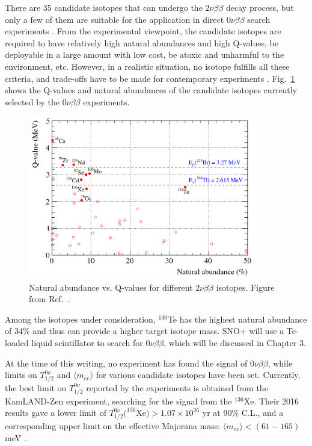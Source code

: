 There are 35 candidate isotopes that can undergo the $2\nu\beta\beta$ decay process, but only a few of them are suitable for the application in direct $0\nu\beta\beta$ search experiments \cite{giunti2007fundamentals}. From the experimental viewpoint, the candidate isotopes are required to have relatively high natural abundances and high Q-values, be deployable in a large amount with low cost, be atoxic and unharmful to the environment, etc. However, in a realistic situation, no isotope fulfills all these criteria, and trade-offs have to be made for contemporary experiments \cite{dolinski2019neutrinoless}. Fig.~\ref{fig:te_abundance} shows the Q-values and natural abundances of the candidate isotopes currently selected by the $0\nu\beta\beta$ experiments.

\begin{figure}[!htb]
	\centering
	\includegraphics[width=10cm]{Te_abundance.png}
	\caption[Natural abundance vs. Q-values for different $2\nu\beta\beta$ isotopes.]{Natural abundance vs. Q-values for different $2\nu\beta\beta$ isotopes. Figure from Ref.~\cite{snop_jinst}.\label{fig:te_abundance}}
\end{figure}

Among the isotopes under consideration, $^{130}$Te has the highest natural abundance of 34\% and thus can provide a higher target isotope mass. SNO+ will use a Te-loaded liquid scintillator to search for $0\nu\beta\beta$, which will be discussed in Chapter 3. 

At the time of this writing, no experiment has found the signal of $0\nu\beta\beta$, while limits on $T^{0\nu}_{1/2}$ and $\langle m_{ee}\rangle$ for various candidate isotopes have been set. Currently, the best limit on $T^{0\nu}_{1/2}$ reported by the experiments is obtained from the KamLAND-Zen experiment, searching for the signal from the $^{136}$Xe. Their 2016 results gave a lower limit of $T^{0\nu}_{1/2}(^{136}$Xe$)>1.07\times 10^{26}$ yr at 90\% C.L., and a corresponding upper limit on the effective Majorana mass: $\langle m_{ee}\rangle<(61-165)$ meV \cite{gando2016search}. 

